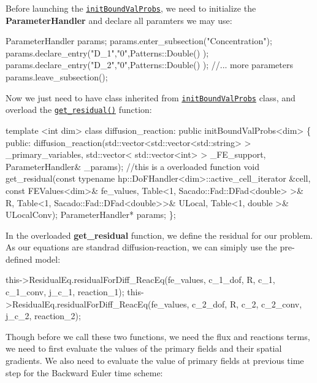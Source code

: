  Before launching the \href{../html/classinit_bound_val_probs.html}{\tt init\-Bound\-Val\-Probs}, we need to initialize the {\bfseries Parameter\-Handler} and declare all paramters we may use\-: 
\begin{DoxyCode}
ParameterHandler params;
params.enter\_subsection(\textcolor{stringliteral}{"Concentration"});   
params.declare\_entry(\textcolor{stringliteral}{"D\_1"},\textcolor{stringliteral}{"0"},Patterns::Double() );
params.declare\_entry(\textcolor{stringliteral}{"D\_2"},\textcolor{stringliteral}{"0"},Patterns::Double() );
\textcolor{comment}{//... more parameters }
params.leave\_subsection();  
\end{DoxyCode}
 Now we just need to have class inherited from \href{../html/classinit_bound_val_probs.html}{\tt init\-Bound\-Val\-Probs} class, and overload the \href{../html/classinit_bound_val_probs.html#ac8f2c3e2a1040c70b709900dc3dfdaea}{\tt get\-\_\-residual()} function\-: 
\begin{DoxyCode}
\textcolor{keyword}{template} <\textcolor{keywordtype}{int} dim>
\textcolor{keyword}{class }diffusion\_reaction: \textcolor{keyword}{public} initBoundValProbs<dim>
\{
    \textcolor{keyword}{public}:
        diffusion\_reaction(std::vector<std::vector<std::string> > \_primary\_variables, std::vector<
      std::vector<int> > \_FE\_support, ParameterHandler& \_params);
        \textcolor{comment}{//this is a overloaded function }
        \textcolor{keywordtype}{void} get_residual(\textcolor{keyword}{const} \textcolor{keyword}{typename} hp::DoFHandler<dim>::active\_cell\_iterator &cell, \textcolor{keyword}{const} 
      FEValues<dim>& fe\_values, Table<1, Sacado::Fad::DFad<double> >& R, Table<1, Sacado::Fad::DFad<double>>& ULocal, 
      Table<1, double >& ULocalConv);
        ParameterHandler* params;       
\};
\end{DoxyCode}
 In the overloaded {\bfseries get\-\_\-residual} function, we define the residual for our problem. As our equations are standrad diffusion-\/reaction, we can simiply use the pre-\/defined model\-: 
\begin{DoxyCode}
this->ResidualEq.residualForDiff_ReacEq(fe\_values, c\_1\_dof, R, c\_1, c\_1\_conv, j\_c\_1, reaction\_1);
this->ResidualEq.residualForDiff_ReacEq(fe\_values, c\_2\_dof, R, c\_2, c\_2\_conv, j\_c\_2, reaction\_2);
\end{DoxyCode}
 Though before we call these two functions, we need the flux and reactions terms, we need to first evaluate the values of the primary fields and their spatial gradients. We also need to evaluate the value of primary fields at previous time step for the Backward Euler time scheme\-: 
